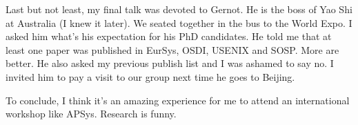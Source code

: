 \documentclass{article}
\begin{document}
\par
Last but not least, my final talk was devoted to Gernot. He is the boss of Yao
Shi at Australia (I knew it later). We seated together in the bus to the World
Expo. I asked him what's his expectation for his PhD candidates. He told me
that at least one paper was published in EurSys, OSDI, USENIX and SOSP. More
are better. He also asked my previous publish list and I was ashamed to say
no. I invited him to pay a visit to our group next time he goes to Beijing.

\par
To conclude, I think it's an amazing experience for me to attend an
international workshop like APSys. Research is funny. 
\end{document}
